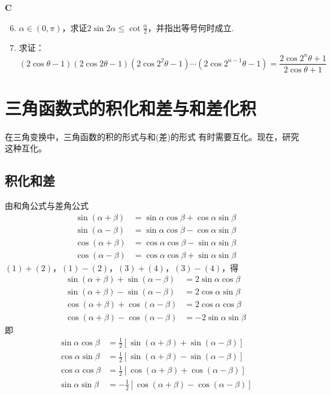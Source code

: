 \begin{center}
    \bfseries C
\end{center}

\begin{enumerate}\setcounter{enumi}{5}
    \item $\alpha\in(0,\pi)$，求证$2\sin2\alpha\le \cot\frac{\alpha}{2}$，并指出等号何时成立.
    \item 求证：$$(2\cos\theta-1)(2\cos2\theta-1)(2\cos2^2\theta-1)\cdots\left(2\cos2^{n-1}\theta-1\right)=\frac{2\cos2^n \theta+1}{2\cos\theta+1}$$
\end{enumerate}

\section{三角函数式的积化和差与和差化积}

在三角变换中，三角函数的积的形式与和(差)的形式
有时需要互化。现在，研究这种互化。

\subsection{积化和差}
由和角公式与差角公式
\begin{align}
\sin(\alpha+\beta)&=\sin\alpha\cos\beta+\cos\alpha\sin\beta  \tag{1}\\
\sin(\alpha-\beta)&=\sin\alpha\cos\beta-\cos\alpha\sin\beta  \tag{2}\\
\cos\left(\alpha+\beta\right)&=\cos\alpha\cos\beta-\sin\alpha\sin\beta  \tag{3}\\
\cos\left(\alpha-\beta\right)&=\cos\alpha\cos\beta+\sin\alpha\sin\beta     \tag{4}
\end{align}
$(1)+(2)$，$(1)-(2)$，$(3)+(4)$，$(3)-(4)$，得
\[\begin{split}
\sin\left(\alpha+\beta\right)+\sin\left(\alpha-\beta\right)&=2\sin\alpha\cos\beta  \\
\sin\left(\alpha+\beta\right)-\sin\left(\alpha-\beta\right)&=2\cos\alpha\sin\beta  \\
\cos(\alpha+\beta)+\cos(\alpha-\beta)&=2\cos\alpha\cos\beta  \\
\cos\left(\alpha+\beta\right)-\cos\left(\alpha-\beta\right)&=-2\sin\alpha\sin\beta
\end{split}\]
即
\begin{align}
\sin \alpha\cos\beta&=\frac{1}{2}[\sin(\alpha+\beta)+\sin(\alpha-\beta)] \tag{5} \\
\cos\alpha\sin\beta&=\frac{1}{2}\left[\sin\left(\alpha+\beta\right)-\sin\left(\alpha-\beta\right)\right]    \tag{6} \\
\cos\alpha\cos\beta&=\frac{1}{2}[\cos(\alpha+\beta)+\cos(\alpha-\beta)]\tag{7}\\
\sin\alpha\sin\beta&=-\frac{1}{2}[\cos(\alpha+\beta)-\cos(\alpha-\beta)]\tag{8}
\end{align}

